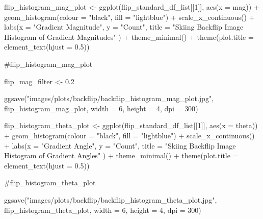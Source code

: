 \documentclass[
  letterpaper,
  DIV=11,
  numbers=noendperiod]{scrreprt}
\newenvironment{Shaded}{\begin{snugshade}}{\end{snugshade}}
\newcommand{\AttributeTok}[1]{\textcolor[rgb]{0.40,0.45,0.13}{#1}}
\newcommand{\CommentTok}[1]{\textcolor[rgb]{0.37,0.37,0.37}{#1}}
\newcommand{\DecValTok}[1]{\textcolor[rgb]{0.68,0.00,0.00}{#1}}
\newcommand{\FloatTok}[1]{\textcolor[rgb]{0.68,0.00,0.00}{#1}}
\newcommand{\FunctionTok}[1]{\textcolor[rgb]{0.28,0.35,0.67}{#1}}
\newcommand{\NormalTok}[1]{\textcolor[rgb]{0.00,0.23,0.31}{#1}}
\newcommand{\OtherTok}[1]{\textcolor[rgb]{0.00,0.23,0.31}{#1}}
\newcommand{\SpecialCharTok}[1]{\textcolor[rgb]{0.37,0.37,0.37}{#1}}
\newcommand{\StringTok}[1]{\textcolor[rgb]{0.13,0.47,0.30}{#1}}
\begin{document}
\begin{Shaded}
\begin{Highlighting}[]
\NormalTok{flip\_histogram\_mag\_plot }\OtherTok{\textless{}{-}}
  \FunctionTok{ggplot}\NormalTok{(flip\_standard\_df\_list[[}\DecValTok{1}\NormalTok{]],}
         \FunctionTok{aes}\NormalTok{(}\AttributeTok{x =}\NormalTok{ mag)) }\SpecialCharTok{+}
  \FunctionTok{geom\_histogram}\NormalTok{(}\AttributeTok{colour =} \StringTok{"black"}\NormalTok{, }\AttributeTok{fill =} \StringTok{"lightblue"}\NormalTok{) }\SpecialCharTok{+}
  \FunctionTok{scale\_x\_continuous}\NormalTok{() }\SpecialCharTok{+}
  \FunctionTok{labs}\NormalTok{(}\AttributeTok{x =} \StringTok{"Gradient Magnitude"}\NormalTok{,}
       \AttributeTok{y =} \StringTok{"Count"}\NormalTok{,}
       \AttributeTok{title =} \StringTok{"Skiing Backflip Image Histogram of Gradient Magnitudes"}
\NormalTok{       ) }\SpecialCharTok{+}
  \FunctionTok{theme\_minimal}\NormalTok{() }\SpecialCharTok{+}
  \FunctionTok{theme}\NormalTok{(}\AttributeTok{plot.title =} \FunctionTok{element\_text}\NormalTok{(}\AttributeTok{hjust =} \FloatTok{0.5}\NormalTok{))}

\CommentTok{\#flip\_histogram\_mag\_plot}

\NormalTok{flip\_mag\_filter }\OtherTok{\textless{}{-}} \FloatTok{0.2}

\FunctionTok{ggsave}\NormalTok{(}\StringTok{"images/plots/backflip/backflip\_histogram\_mag\_plot.jpg"}\NormalTok{, flip\_histogram\_mag\_plot, }\AttributeTok{width =} \DecValTok{6}\NormalTok{, }\AttributeTok{height =} \DecValTok{4}\NormalTok{, }\AttributeTok{dpi =} \DecValTok{300}\NormalTok{)}



\NormalTok{flip\_histogram\_theta\_plot }\OtherTok{\textless{}{-}}
  \FunctionTok{ggplot}\NormalTok{(flip\_standard\_df\_list[[}\DecValTok{1}\NormalTok{]],}
         \FunctionTok{aes}\NormalTok{(}\AttributeTok{x =}\NormalTok{ theta)) }\SpecialCharTok{+}
  \FunctionTok{geom\_histogram}\NormalTok{(}\AttributeTok{colour =} \StringTok{"black"}\NormalTok{, }\AttributeTok{fill =} \StringTok{"lightblue"}\NormalTok{) }\SpecialCharTok{+}
  \FunctionTok{scale\_x\_continuous}\NormalTok{() }\SpecialCharTok{+}
  \FunctionTok{labs}\NormalTok{(}\AttributeTok{x =} \StringTok{"Gradient Angle"}\NormalTok{,}
       \AttributeTok{y =} \StringTok{"Count"}\NormalTok{,}
       \AttributeTok{title =} \StringTok{"Skiing Backflip Image Histogram of Gradient Angles"}
\NormalTok{       ) }\SpecialCharTok{+}
  \FunctionTok{theme\_minimal}\NormalTok{() }\SpecialCharTok{+}
  \FunctionTok{theme}\NormalTok{(}\AttributeTok{plot.title =} \FunctionTok{element\_text}\NormalTok{(}\AttributeTok{hjust =} \FloatTok{0.5}\NormalTok{))}

\CommentTok{\#flip\_histogram\_theta\_plot}

\FunctionTok{ggsave}\NormalTok{(}\StringTok{"images/plots/backflip/backflip\_histogram\_theta\_plot.jpg"}\NormalTok{, flip\_histogram\_theta\_plot, }\AttributeTok{width =} \DecValTok{6}\NormalTok{, }\AttributeTok{height =} \DecValTok{4}\NormalTok{, }\AttributeTok{dpi =} \DecValTok{300}\NormalTok{)}
\end{Highlighting}
\end{Shaded}
\end{document}
